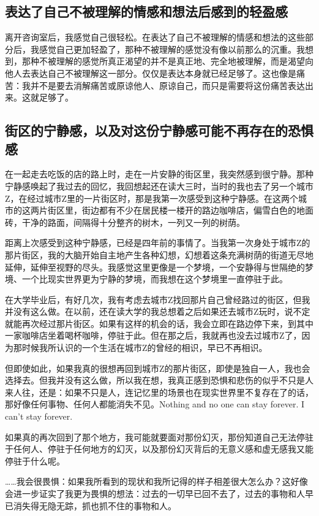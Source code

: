 \subsection*{表达了自己不被理解的情感和想法后感到的轻盈感}

离开咨询室后，我感觉自己很轻松。在表达了自己不被理解的情感和想法的这些部分后，我感觉自己更加轻盈了，那种不被理解的感觉没有像以前那么的沉重。我想到，那种不被理解的感觉所真正渴望的并不是真正地、完全地被理解，而是渴望向他人去表达自己不被理解这一部分。仅仅是表达本身就已经足够了。这也像是痛苦：我并不是要去消解痛苦或原谅他人、原谅自己，而只是需要将这份痛苦表达出来。这就足够了。



\subsection*{街区的宁静感，以及对这份宁静感可能不再存在的恐惧感}

在一起走去吃饭的店的路上时，走在一片安静的街区里，我突然感到很宁静。那种宁静感唤起了我过去的回忆，我回想起还在读大三时，当时的我也去了另一个城市Z，在经过城市Z里的一片街区时，那是我第一次感受到这种宁静感。在这两个城市的这两片街区里，街边都有不少在居民楼一楼开的路边咖啡店，偏雪白色的地面砖，干净的路面，间隔得十分整齐的树木，一列又一列的树荫。

距离上次感受到这种宁静感，已经是四年前的事情了。当我第一次身处于城市Z的那片街区，我的大脑开始自主地产生各种幻想，幻想着这条充满树荫的街道无尽地延伸，延伸至视野的尽头。我感觉这里更像是一个梦境，一个安静得与世隔绝的梦境、一个比现实世界更为宁静的梦境，而我想在这个梦境里一直停驻于此。

在大学毕业后，有好几次，我有考虑去城市Z找回那片自己曾经路过的街区，但我并没有这么做。在以前，还在读大学的我总想着之后如果还去城市Z玩时，说不定就能再次经过那片街区。如果有这样的机会的话，我会立即在路边停下来，到其中一家咖啡店坐着喝杯咖啡，停驻于此。但在那之后，我就再也没去过城市Z了，因为那时候我所认识的一个生活在城市Z的曾经的相识，早已不再相识。

但即使如此，如果我真的很想再回到城市Z的那片街区，即使是独自一人，我也会选择去。但我并没有这么做，所以我在想，我真正感到恐惧和悲伤的似乎不只是人来人往，还是：如果不只是人，连记忆里的场景也在现实世界里不复存在了的话，那好像任何事物、任何人都能消失不见。Nothing and no one can stay forever. I can't stay forever.

如果真的再次回到了那个地方，我可能就要面对那份幻灭，那份知道自己无法停驻于任何人、停驻于任何地方的幻灭，以及那份幻灭背后的无意义感和虚无感\pozhehao{}我又能停驻于什么呢。

……我会很畏惧：如果我所看到的现状和我所记得的样子相差很大怎么办？这好像会进一步证实了我更为畏惧的想法：过去的一切早已回不去了，过去的事物和人早已消失得无隐无踪，抓也抓不住的事物和人。






